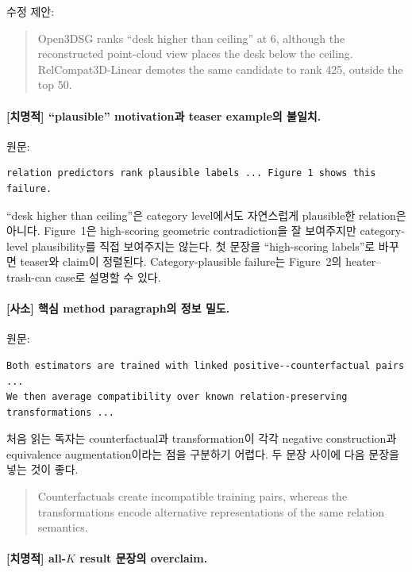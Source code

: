 \documentclass[11pt]{article}
\newcommand{\fatal}{\textbf{\textcolor{fatalred}{[치명적]}}}
\newcommand{\minor}{\textbf{\textcolor{minorblue}{[사소]}}}
\begin{document}
수정 제안:
\begin{quote}
Open3DSG ranks ``desk higher than ceiling'' at 6, although the reconstructed
point-cloud view places the desk below the ceiling. RelCompat3D-Linear demotes
the same candidate to rank 425, outside the top 50.
\end{quote}

\paragraph{\fatal{} ``plausible'' motivation과 teaser example의 불일치.}

원문:
\begin{verbatim}
relation predictors rank plausible labels ... Figure 1 shows this failure.
\end{verbatim}

``desk higher than ceiling''은 category level에서도 자연스럽게 plausible한 relation은
아니다. Figure~1은 high-scoring geometric contradiction을 잘 보여주지만 category-level
plausibility를 직접 보여주지는 않는다. 첫 문장을 ``high-scoring labels''로 바꾸면
teaser와 claim이 정렬된다. Category-plausible failure는 Figure~2의 heater--trash-can
case로 설명할 수 있다.

\paragraph{\minor{} 핵심 method paragraph의 정보 밀도.}

원문:
\begin{verbatim}
Both estimators are trained with linked positive--counterfactual pairs ...
We then average compatibility over known relation-preserving transformations ...
\end{verbatim}

처음 읽는 독자는 counterfactual과 transformation이 각각 negative construction과
equivalence augmentation이라는 점을 구분하기 어렵다. 두 문장 사이에 다음 문장을
넣는 것이 좋다.

\begin{quote}
Counterfactuals create incompatible training pairs, whereas the transformations
encode alternative representations of the same relation semantics.
\end{quote}

\paragraph{\fatal{} all-$K$ result 문장의 overclaim.}
\end{document}
